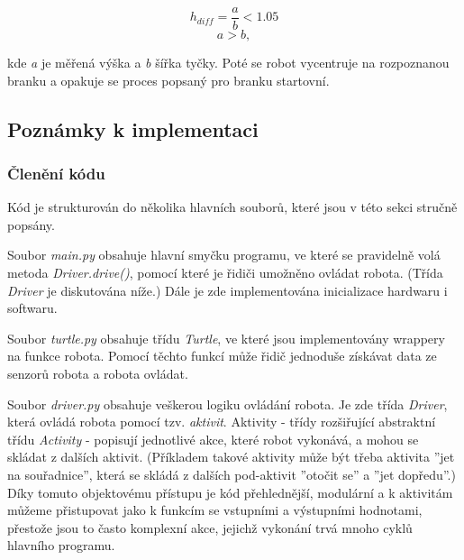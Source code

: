 \documentclass{article}
\begin{document}
	\begin{equation}
		h_{diff} = \frac{a}{b} < 1.05 
	\end{equation}
	\begin{equation}
		a > b,
	\end{equation}
	
	kde {\it a} je měřená výška a {\it b} šířka tyčky. 
	Poté se robot vycentruje na rozpoznanou branku a opakuje se proces popsaný pro branku startovní. 
	
	

\subsection{Poznámky k implementaci}

\subsubsection{Členění kódu}

	Kód je strukturován do několika hlavních souborů, které jsou v této sekci stručně popsány.
	
	Soubor \emph{main.py} obsahuje hlavní smyčku programu, ve které se pravidelně volá metoda \emph{Driver.drive()}, pomocí které je řidiči umožněno ovládat robota. (Třída \emph{Driver} je diskutována níže.) Dále je zde implementována inicializace hardwaru i softwaru.
	
	Soubor \emph{turtle.py} obsahuje třídu \emph{Turtle}, ve které jsou implementovány wrappery na funkce robota. Pomocí těchto funkcí může řidič jednoduše získávat data ze senzorů robota a robota ovládat.
	
	Soubor \emph{driver.py} obsahuje veškerou logiku ovládání robota. Je zde třída \emph{Driver}, která ovládá robota pomocí tzv. \emph{aktivit}. Aktivity - třídy rozšiřující abstraktní třídu \emph{Activity} - popisují jednotlivé akce, které robot vykonává, a mohou se skládat z dalších aktivit. (Příkladem takové aktivity může být třeba aktivita ''jet na souřadnice'', která se skládá z dalších pod-aktivit ''otočit se'' a ''jet dopředu''.) Díky tomuto objektovému přístupu je kód přehlednější, modulární a k aktivitám můžeme přistupovat jako k funkcím se vstupními a výstupními hodnotami, přestože jsou to často komplexní akce, jejichž vykonání trvá mnoho cyklů hlavního programu.
	
\end{document}
